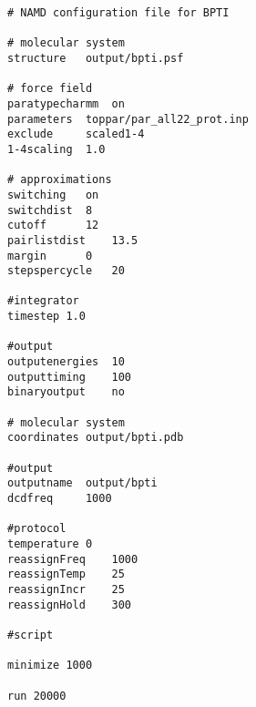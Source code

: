 \newpage
\begin{verbatim}
# NAMD configuration file for BPTI

# molecular system
structure	output/bpti.psf

# force field
paratypecharmm	on
parameters	toppar/par_all22_prot.inp
exclude		scaled1-4
1-4scaling	1.0

# approximations
switching	on
switchdist	8
cutoff		12
pairlistdist	13.5
margin		0
stepspercycle	20

#integrator
timestep 1.0

#output
outputenergies	10
outputtiming	100
binaryoutput	no

# molecular system
coordinates	output/bpti.pdb

#output
outputname	output/bpti
dcdfreq		1000

#protocol
temperature	0
reassignFreq	1000
reassignTemp	25
reassignIncr	25
reassignHold	300

#script

minimize 1000

run 20000
\end{verbatim}

